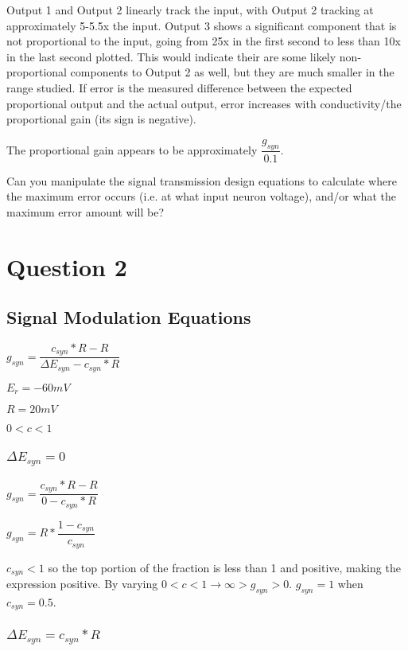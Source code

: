 Output 1 and Output 2 linearly track the input, with Output 2 tracking at approximately 5-5.5x the input. Output 3 shows a significant component that is not proportional to the input, going from 25x in the first second to less than 10x in the last second plotted. This would indicate their are some likely non-proportional components to Output 2 as well, but they are much smaller in the range studied. If error is the measured difference between the expected proportional output and the actual output, error increases with conductivity/the proportional gain (its sign is negative).

The proportional gain appears to be approximately $\dfrac{g_{syn}}{0.1}$.

Can you manipulate the signal transmission design 
equations to calculate where the maximum error occurs (i.e. at what input 
neuron voltage), and/or what the maximum error amount will be?


\section{Question 2}

\subsection{Signal Modulation Equations}

$g_{syn} = \dfrac{c_{syn} * R - R}{\Delta E_{syn} - c_{syn} * R}$

$E_{r} = -60mV$

$R = 20mV$

$0 < c < 1$

\subsubsection{$\Delta E_{syn} = 0$}

$g_{syn} = \dfrac{c_{syn} * R - R}{0 - c_{syn} * R}$

$g_{syn} = R * \dfrac{1 - c_{syn}}{c_{syn}}$

$c_{syn} < 1$ so the top portion of the fraction is less than 1 and positive, making the expression positive.
By varying $0 < c < 1 \rightarrow \infty > g_{syn} > 0$. $g_{syn} = 1$ when $c_{syn} = 0.5$.

\subsubsection{$\Delta E_{syn} = c_{syn} * R$}

